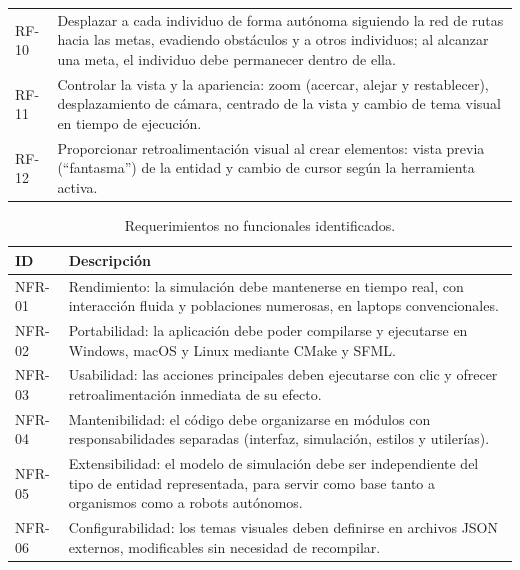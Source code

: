 \documentclass[12pt,a4paper]{article}
\begin{document}
\begin{table}[H]
\begin{tabularx}{\textwidth}{p{2.2cm} X}
        RF-10 &
        Desplazar a cada individuo de forma autónoma siguiendo la red de rutas hacia las metas, evadiendo obstáculos y a otros individuos; al alcanzar una meta, el individuo debe permanecer dentro de ella. \\

        RF-11 &
        Controlar la vista y la apariencia: zoom (acercar, alejar y restablecer), desplazamiento de cámara, centrado de la vista y cambio de tema visual en tiempo de ejecución. \\

        RF-12 &
        Proporcionar retroalimentación visual al crear elementos: vista previa (``fantasma'') de la entidad y cambio de cursor según la herramienta activa. \\

        \bottomrule
    \end{tabularx}
\end{table}

\begin{table}[H]
    \centering
    \caption{Requerimientos no funcionales identificados.}
    \label{tab:requerimientos_no_funcionales}
    \begin{tabularx}{\textwidth}{p{2.2cm} X}
        \toprule
        \textbf{ID} & \textbf{Descripción} \\
        \midrule

        NFR-01 &
        Rendimiento: la simulación debe mantenerse en tiempo real, con interacción fluida y poblaciones numerosas, en laptops convencionales. \\

        NFR-02 &
        Portabilidad: la aplicación debe poder compilarse y ejecutarse en Windows, macOS y Linux mediante CMake y SFML. \\

        NFR-03 &
        Usabilidad: las acciones principales deben ejecutarse con clic y ofrecer retroalimentación inmediata de su efecto. \\

        NFR-04 &
        Mantenibilidad: el código debe organizarse en módulos con responsabilidades separadas (interfaz, simulación, estilos y utilerías). \\

        NFR-05 &
        Extensibilidad: el modelo de simulación debe ser independiente del tipo de entidad representada, para servir como base tanto a organismos como a robots autónomos. \\

        NFR-06 &
        Configurabilidad: los temas visuales deben definirse en archivos JSON externos, modificables sin necesidad de recompilar. \\

        \bottomrule
    \end{tabularx}
\end{table}
\end{document}
